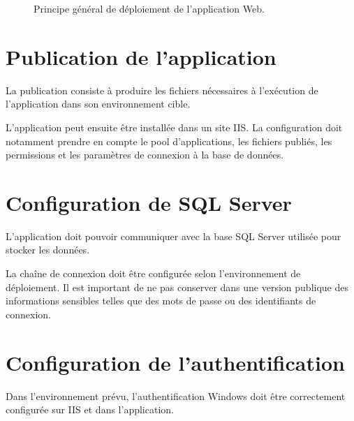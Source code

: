 \documentclass[12pt,a4paper,oneside]{report}
\begin{document}
\begin{figure}[H]
\centering
{}
\caption{Principe général de déploiement de l'application Web.}
\end{figure}

\section{Publication de l'application}

La publication consiste à produire les fichiers nécessaires à l'exécution de l'application dans son environnement cible.

L'application peut ensuite être installée dans un site IIS. La configuration doit notamment prendre en compte le pool d'applications, les fichiers publiés, les permissions et les paramètres de connexion à la base de données.

\section{Configuration de SQL Server}

L'application doit pouvoir communiquer avec la base SQL Server utilisée pour stocker les données.

La chaîne de connexion doit être configurée selon l'environnement de déploiement. Il est important de ne pas conserver dans une version publique des informations sensibles telles que des mots de passe ou des identifiants de connexion.

\section{Configuration de l'authentification}

Dans l'environnement prévu, l'authentification Windows doit être correctement configurée sur IIS et dans l'application.
\end{document}
